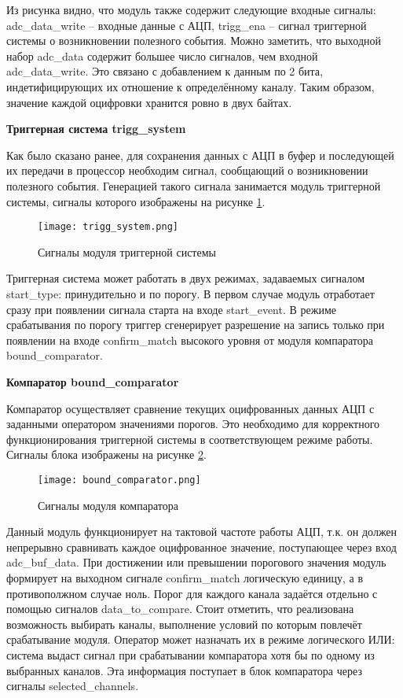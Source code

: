Из рисунка видно, что модуль также содержит следующие входные сигналы: adc\_data\_write -- входные данные с АЦП, trigg\_ena -- сигнал триггерной системы о возникновении полезного события. Можно заметить, что выходной набор adc\_data содержит большее число сигналов, чем входной adc\_data\_write. Это связано с добавлением к данным по 2 бита, индетифицирующих их отношение к определённому каналу. Таким образом, значение каждой оцифровки хранится ровно в двух байтах.\par
\textbf{Триггерная система trigg\_system}\par
Как было сказано ранее, для сохранения данных с АЦП в буфер и последующей их передачи в процессор необходим сигнал, сообщающий о возникновении полезного события. Генерацией такого сигнала занимается модуль триггерной системы, сигналы которого изображены на рисунке \ref{fig:trigg_system}.\par
\begin{figure}[ht]
    \centering
    \texttt{[image: trigg\_system.png]}
    \caption{Сигналы модуля триггерной системы}
    \label{fig:trigg_system}
\end{figure}
Триггерная система может работать в двух режимах, задаваемых сигналом start\_type: принудительно и по порогу. В первом случае модуль отработает сразу при появлении сигнала старта на входе start\_event. В режиме срабатывания по порогу триггер сгенерирует разрешение на запись только при появлении на входе confirm\_match высокого уровня от модуля компаратора bound\_comparator.\par
\textbf{Компаратор bound\_comparator}\par
Компаратор осуществляет сравнение текущих оцифрованных данных АЦП с заданными оператором значениями порогов. Это необходимо для корректного функционирования триггерной системы в соответствующем режиме работы. Сигналы блока изображены на рисунке \ref{fig:bound_comparator}.\par
\begin{figure}[ht]
    \centering
    \texttt{[image: bound\_comparator.png]}
    \caption{Сигналы модуля компаратора}
    \label{fig:bound_comparator}
\end{figure}
Данный модуль функционирует на тактовой частоте работы АЦП, т.к. он должен непрерывно сравнивать каждое оцифрованное значение, поступающее через вход adc\_buf\_data. При достижении или превышении порогового значения модуль формирует на выходном сигнале confirm\_match логическую единицу, а в противополжном случае ноль. Порог для каждого канала задаётся отдельно с помощью сигналов data\_to\_compare. Стоит отметить, что реализована возможность выбирать каналы, выполнение условий по которым повлечёт срабатывание модуля. Оператор может назначать их в режиме логического ИЛИ: система выдаст сигнал при срабатывании компаратора хотя бы по одному из выбранных каналов. Эта информация поступает в блок компаратора через сигналы selected\_channels.\par
